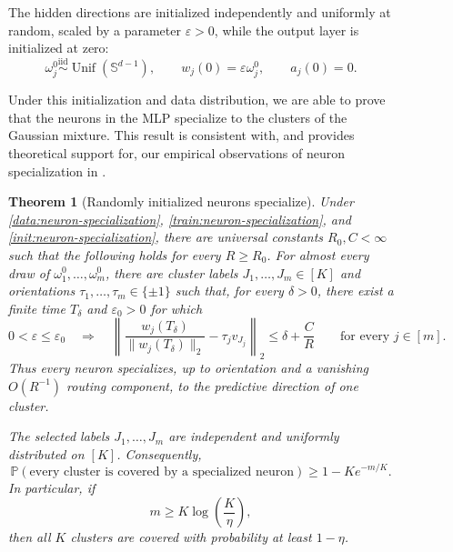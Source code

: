 \documentclass{article}
\newcounter{setting}[section]
\newcounter{initialization}[section]
\newcounter{initializationsetting}
\newtheorem{theorem}{Theorem}
\begin{document}
\begin{figure}
\begin{initializationsetting}
The hidden directions are initialized independently and uniformly at random, scaled by a parameter $\varepsilon > 0$,
while the output layer is initialized at zero:
\[
    \omega_j^0
    \stackrel{\mathrm{iid}}{\sim}
    \operatorname{Unif}(\mathbb S^{d-1}),
    \qquad
    w_j(0)=\varepsilon\omega_j^0,
    \qquad
    a_j(0)=0.
\]

\end{initializationsetting}

Under this initialization and data distribution, we are able to prove that the neurons in the MLP specialize to the clusters of the Gaussian mixture.
This result is consistent with, and provides theoretical support for, our empirical observations of neuron specialization in .

\begin{theorem}[Randomly initialized neurons specialize]
\label{thm:neurons-specialize}
Under \cref{data:neuron-specialization}, \cref{train:neuron-specialization},
and \cref{init:neuron-specialization}, there are universal constants
$R_0,C<\infty$ such that the following holds
for every $R\geq R_0$. For almost every draw of
$\omega_1^0,\ldots,\omega_m^0$, there are cluster labels
$J_1,\ldots,J_m\in[K]$ and orientations
$\tau_1,\ldots,\tau_m\in\{\pm1\}$ such that, for every $\delta>0$, there
exist a finite time $T_\delta$ and $\varepsilon_0>0$ for which
\[
    0<\varepsilon\leq\varepsilon_0
    \quad\Longrightarrow\quad
    \left\|
        \frac{w_j(T_\delta)}{\|w_j(T_\delta)\|_2}
        -\tau_j v_{J_j}
    \right\|_2
    \leq
    \delta+\frac{C}{R}
    \qquad\text{for every }j\in[m].
\]
Thus every neuron specializes, up to orientation and a vanishing
$O(R^{-1})$ routing component, to the predictive direction of one cluster.

The selected labels $J_1,\ldots,J_m$ are independent and uniformly
distributed on $[K]$. Consequently,
\[
    \mathbb P\left(
        \text{every cluster is covered by a specialized neuron}
    \right)
    \geq
    1-Ke^{-m/K}.
\]
In particular, if
\[
    m\geq K\log\left(\frac{K}{\eta}\right),
\]
then all $K$ clusters are covered with probability at least $1-\eta$.
\end{theorem}


\end{figure}
\end{document}
